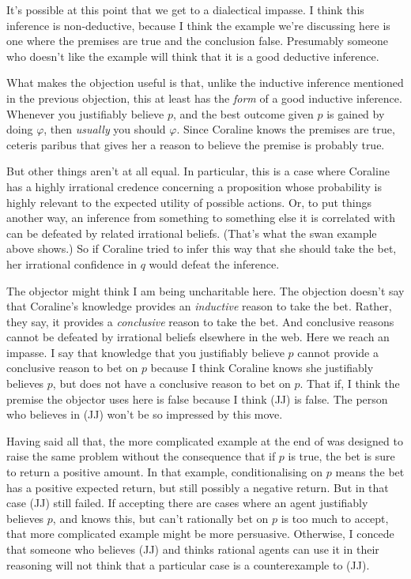 {It's possible at this point that we get to a dialectical impasse. I think this inference is non-deductive, because I think the example we're discussing here is one where the premises are true and the conclusion false. Presumably someone who doesn't like the example will think that it is a good deductive inference.

What makes the objection useful is that, unlike the inductive inference mentioned in the previous objection, this at least has the \textit{form} of a good inductive inference. Whenever you justifiably believe \(p\), and the best outcome given \(p\) is gained by doing \(\varphi\), then \textit{usually} you should \(\varphi\). Since Coraline knows the premises are true, ceteris paribus that gives her a reason to believe the premise is probably true.

But other things aren't at all equal. In particular, this is a case where Coraline has a highly irrational credence concerning a proposition whose probability is highly relevant to the expected utility of possible actions. Or, to put things another way, an inference from something to something else it is correlated with can be defeated by related irrational beliefs. (That's what the swan example above shows.) So if Coraline tried to infer this way that she should take the bet, her irrational confidence in \(q\) would defeat the inference.

The objector might think I am being uncharitable here. The objection doesn't say that Coraline's knowledge provides an \textit{inductive} reason to take the bet. Rather, they say, it provides a \textit{conclusive} reason to take the bet. And conclusive reasons cannot be defeated by irrational beliefs elsewhere in the web. Here we reach an impasse. I say that knowledge that you justifiably believe \(p\) cannot provide a conclusive reason to bet on \(p\) because I think Coraline knows she justifiably believes \(p\), but does not have a conclusive reason to bet on \(p\). That if, I think the premise the objector uses here is false because I think (JJ) is false. The person who believes in (JJ) won't be so impressed by this move. 

Having said all that, the more complicated example at the end of \cite{Weatherson2005-WEACWD} was designed to raise the same problem without the consequence that if \(p\) is true, the bet is sure to return a positive amount. In that example, conditionalising on \(p\) means the bet has a positive expected return, but still possibly a negative return. But in that case (JJ) still failed. If accepting there are cases where an agent justifiably believes \(p\), and knows this, but can't rationally bet on \(p\) is too much to accept, that more complicated example might be more persuasive. Otherwise, I concede that someone who believes (JJ) and thinks rational agents can use it in their reasoning will not think that a particular case is a counterexample to (JJ).}

